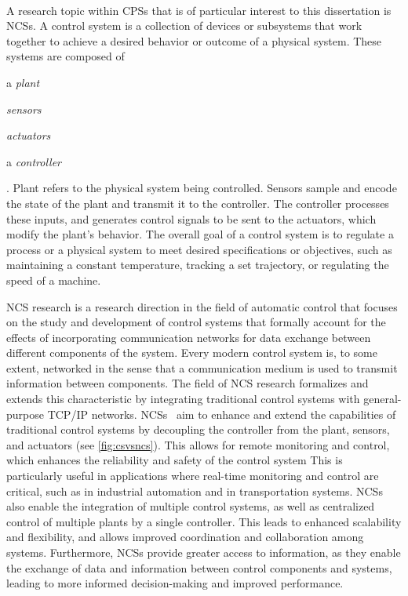 \paragraph{}\label{background:ncs}

A research topic within \glspl{CPS} that is of particular interest to this dissertation is \glspl{NCS}. 
A control system is a collection of devices or subsystems that work together to achieve a desired behavior or outcome of a physical system.
These systems are composed of
\begin{inlineenum}
    \item a \emph{plant}
    \item \emph{sensors}
    \item \emph{actuators}
    \item a \emph{controller}
\end{inlineenum}.
Plant refers to the physical system being controlled.
Sensors sample and encode the state of the plant and transmit it to the controller.
The controller processes these inputs, and generates control signals to be sent to the actuators, which modify the plant's behavior.
The overall goal of a control system is to regulate a process or a physical system to meet desired specifications or objectives, such as maintaining a constant temperature, tracking a set trajectory, or regulating the speed of a machine.

\gls{NCS} research is a research direction in the field of automatic control that focuses on the study and development of control systems that formally account for the effects of incorporating communication networks for data exchange between different components of the system.
Every modern control system is, to some extent, networked in the sense that a communication medium is used to transmit information between components.
The field of \gls{NCS} research formalizes and extends this characteristic by integrating traditional control systems with general-purpose \acs{TCP}/\acs{IP} networks.
\glspl{NCS}~\cite{gupta2010networked} aim to enhance and extend the capabilities of traditional control systems by decoupling the controller from the plant, sensors, and actuators (see \cref{fig:csvsncs}).
This allows for remote monitoring and control, which enhances the reliability and safety of the control system
This is particularly useful in applications where real-time monitoring and control are critical, such as in industrial automation and in transportation systems.
\glspl{NCS} also enable the integration of multiple control systems, as well as centralized control of multiple plants by a single controller.
This leads to enhanced scalability and flexibility, and allows improved coordination and collaboration among systems.
Furthermore, \glspl{NCS} provide greater access to information, as they enable the exchange of data and information between control components and systems, leading to more informed decision-making and improved performance.


